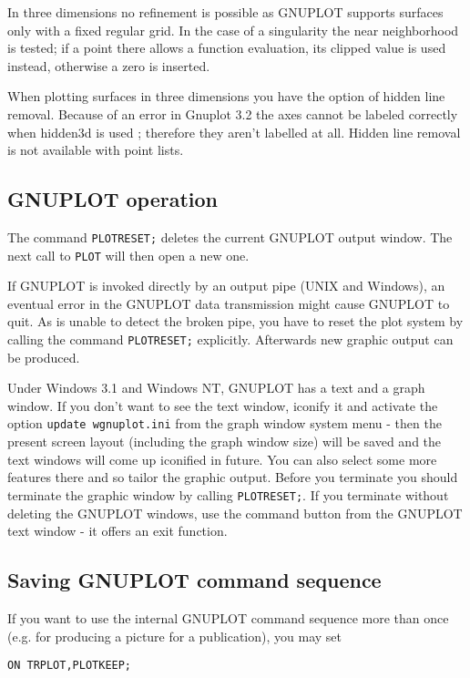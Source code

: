 In three dimensions no refinement is possible as 
GNUPLOT supports surfaces
only with a fixed regular grid. In the case
of a singularity the near neighborhood is
tested; if a point there allows a function evaluation, its 
clipped value is used instead, otherwise a zero is inserted.

When plotting surfaces in three dimensions you have the
option of hidden line removal. Because of an error in
Gnuplot 3.2 the axes cannot be labeled
correctly when hidden3d is used ; therefore they aren't labelled at all. Hidden line
removal is not available with point lists.


\subsection{GNUPLOT operation}

The command \verb+PLOTRESET;+ deletes the current GNUPLOT output
window. The next call to \verb+PLOT+ will then open a new one.

If GNUPLOT is invoked directly by an output pipe (UNIX and Windows),
an eventual error in the GNUPLOT data transmission might cause GNUPLOT to
quit. As {\REDUCE} is unable to detect the broken pipe, you
have to reset the plot system by calling the 
command \verb+PLOTRESET;+ explicitly. Afterwards new graphic output
can be produced. 

Under Windows 3.1 and Windows NT, GNUPLOT has a text and a graph window.
If you don't want to see the text window, iconify it and
activate the option \verb+update wgnuplot.ini+ from the
graph window system menu - then the present screen layout
(including the graph window size) will be saved and the text
windows will come up iconified in future. You can also select 
some more features there and so tailor the graphic output.
Before you terminate {\REDUCE} you should terminate the
graphic window by calling \verb+PLOTRESET;+.
If you terminate {\REDUCE} without deleting the
GNUPLOT windows, use the command button from the
GNUPLOT text window - it offers an exit function.

\subsection{Saving GNUPLOT command sequence}

If you want to use the internal GNUPLOT command sequence
more than once (e.g. for producing a picture for a publication),
you may set 

\begin{verbatim}
ON TRPLOT,PLOTKEEP;
\end{verbatim}

